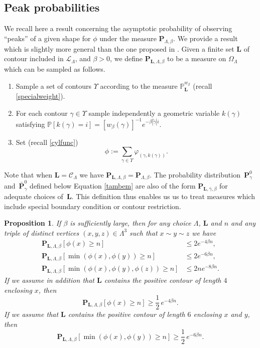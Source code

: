 \documentclass[10pt]{amsart}
\let\mathcal\mathscr
\numberwithin{equation}{section}
\theoremstyle{plain}
\newtheorem{proposition}[theorem]{Proposition}
\theoremstyle{definition}
\newcommand{\cC}{{\ensuremath{\mathcal C}} }
\newcommand{\cL}{{\ensuremath{\mathcal L}} }
\newcommand{\bP}{{\ensuremath{\mathbf P}} }
\newcommand{\bL}{{\ensuremath{\mathbf L}} }
\newcommand{\bbP}{{\ensuremath{\mathbb P}} }
\newcommand{\gb}{\beta}
\newcommand{\gO}{\Omega}
\newcommand{\gL}{\Lambda}
\begin{document}
\subsection{Peak probabilities}\label{peaksec}

We recall here a result concerning the asymptotic probability of observing ``peaks'' of a given shape for $\phi$ under the measure $\bP_{\gL,\gb}$.
We provide a result which is slightly more general than the one proposed in \cite[Prop.\,4.5]{cf:part1}.
Given a finite set $\bL$ of contour included in $\cL_\gL$, and $\gb>0$, we define $\bP_{\bL,\gL,\gb}$ to be a measure on $\gO_{\gL}$
which can be sampled as follows.
\begin{enumerate}
\item [(A)] Sample a set of contours $\Upsilon$ according to the measure $\bbP^{w_{\gb}}_{\bL}$ (recall \eqref{specialweight}).
\item [(B)] For each contour $\gamma\in \Upsilon$ sample independently a geometric variable $k(\gamma)$ satisfying
$\bbP[k(\gamma)=i]=[w_{\gb}(\gamma)]^{-1} e^{-\gb|\tilde \gamma|i}$.
\item [(C)] Set (recall \eqref{cylfunc})
\[
\phi:=\sum_{\gamma\in \Upsilon} \varphi_{(\gamma,k(\gamma))}.
\]
\end{enumerate}
Note that when $\bL=\cC_{\gL}$ we have $\bP_{\bL,\gL,\gb}=\bP_{\gL,\gb}$. The probability distribution~$\bP^0_{\gamma}$ and~$\bar \bP^0_{\gamma}$ defined below
Equation \eqref{tambem} are also of the form $\bP_{\bL,\bar \gamma,\gb}$ for adequate choices of~$\bL$.
This definition thus enables us us to treat measures which include special boundary condition or contour restriction.

\begin{proposition}\label{rouxrou}
If $\gb$ is sufficiently large, then for any choice $\gL$, $\bL$ and $n$ and any triple of distinct vertices $(x,y,z)\in \gL^3$
such that $x\sim y \sim z$ we have
\begin{equation}\label{zups}
\begin{split}
\bP_{\bL,\gL,\gb}[\phi(x)\ge n]&\le 2 e^{-4\gb n},\\
\bP_{\bL,\gL,\gb}[\min(\phi(x),\phi(y)) \ge n]&\le 2 e^{-6\gb n},\\
\bP_{\bL,\gL,\gb}[\min(\phi(x),\phi(y),\phi(z))\ge n]&\le 2 ne^{-8\gb n}.
\end{split}
\end{equation}
If we assume in addition that $\bL$ contains the positive contour of length $4$ enclosing $x$, then
\begin{equation}\label{infin}
\bP_{\bL,\gL,\gb}[\phi(x)\ge n]\ge \frac{1}{2}\, e^{-4\gb n}.
\end{equation}
If we assume that $\bL$ contains the positive contour of length $6$ enclosing $x$ and $y$, then
\begin{equation}\label{infde}
\bP_{\bL,\gL,\gb}[\min (\phi(x),\phi(y))\ge n]\ge \frac{1}{2}\, e^{-6\gb n}.
\end{equation}
\end{proposition}
\end{document}
